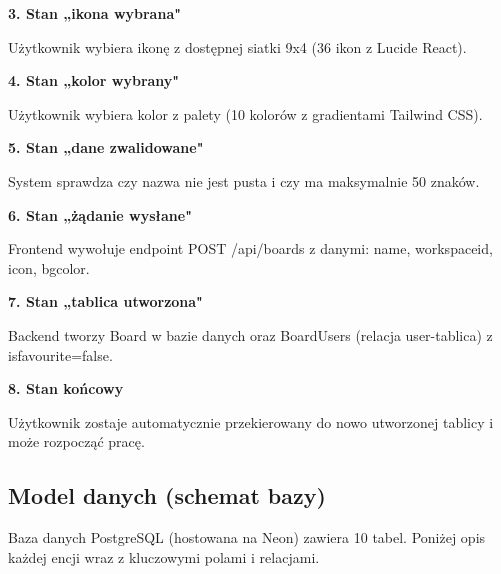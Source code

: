 \documentclass[12pt,a4paper]{article}
\begin{document}
\textbf{3. Stan „ikona wybrana"}

Użytkownik wybiera ikonę z dostępnej siatki 9x4 (36 ikon z Lucide React).

\textbf{4. Stan „kolor wybrany"}

Użytkownik wybiera kolor z palety (10 kolorów z gradientami Tailwind CSS).

\textbf{5. Stan „dane zwalidowane"}

System sprawdza czy nazwa nie jest pusta i czy ma maksymalnie 50 znaków.

\textbf{6. Stan „żądanie wysłane"}

Frontend wywołuje endpoint POST /api/boards z danymi: name, workspaceid, icon, bgcolor.

\textbf{7. Stan „tablica utworzona"}

Backend tworzy Board w bazie danych oraz BoardUsers (relacja user-tablica) z isfavourite=false.

\textbf{8. Stan końcowy}

Użytkownik zostaje automatycznie przekierowany do nowo utworzonej tablicy i może rozpocząć pracę.



\subsection{Model danych (schemat bazy)}

Baza danych PostgreSQL (hostowana na Neon) zawiera 10 tabel. Poniżej opis każdej encji wraz z kluczowymi polami i relacjami.
\end{document}

